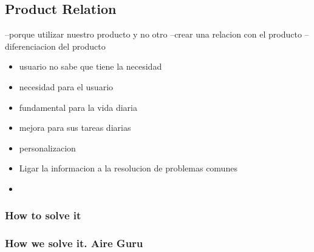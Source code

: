 \subsection{Product Relation}
--porque utilizar nuestro producto y no otro 
--crear una relacion con el producto
--diferenciacion del producto 

\begin{itemize}

    \item usuario no sabe que tiene la necesidad
    \item necesidad para el usuario
    \item fundamental para la vida diaria
    \item mejora para sus tareas diarias
    \item personalizacion
    \item Ligar la informacion a la resolucion de problemas comunes
    \item \end{itemize}
\subsubsection{How to solve it} 


\subsubsection{How we solve it. Aire Guru} 
 
\begin{itemize}
    \done
    \crossed
    
\end{itemize}
\newpage